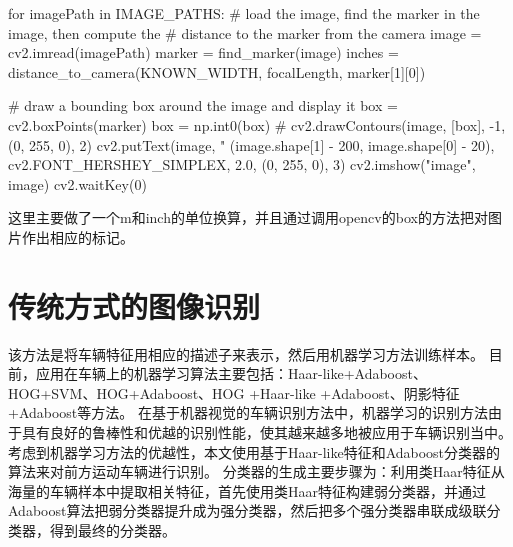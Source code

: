 \documentclass[12pt]{report}
\begin{document}
\begin{python}
    for imagePath in IMAGE_PATHS:
    # load the image, find the marker in the image, then compute the
    # distance to the marker from the camera
        image = cv2.imread(imagePath)
        marker = find_marker(image)
        inches = distance_to_camera(KNOWN_WIDTH, focalLength, marker[1][0])

    # draw a bounding box around the image and display it
        box = cv2.boxPoints(marker)
        box = np.int0(box)
        #%
        cv2.drawContours(image, [box], -1, (0, 255, 0), 2)
        cv2.putText(image, "%
      (image.shape[1] - 200, image.shape[0] - 20), cv2.FONT_HERSHEY_SIMPLEX,
      2.0, (0, 255, 0), 3)
        cv2.imshow("image", image)
        cv2.waitKey(0)
\end{python}

这里主要做了一个m和inch的单位换算，并且通过调用opencv的box的方法把对图片作出相应的标记。
\newpage
\section{传统方式的图像识别}
该方法是将车辆特征用相应的描述子来表示，然后用机器学习方法训练样本。
\newline\newline
目前，应用在车辆上的机器学习算法主要包括：Haar-like+Adaboost、HOG+SVM、HOG+Adaboost、HOG +Haar-like +Adaboost、阴影特征+Adaboost等方法。
\newline\newline
在基于机器视觉的车辆识别方法中，机器学习的识别方法由于具有良好的鲁棒性和优越的识别性能，使其越来越多地被应用于车辆识别当中。考虑到机器学习方法的优越性，本文使用基于Haar-like特征和Adaboost分类器的算法来对前方运动车辆进行识别。
\newline\newline
分类器的生成主要步骤为：利用类Haar特征从海量的车辆样本中提取相关特征，首先使用类Haar特征构建弱分类器，并通过Adaboost算法把弱分类器提升成为强分类器，然后把多个强分类器串联成级联分类器，得到最终的分类器。
\end{document}
